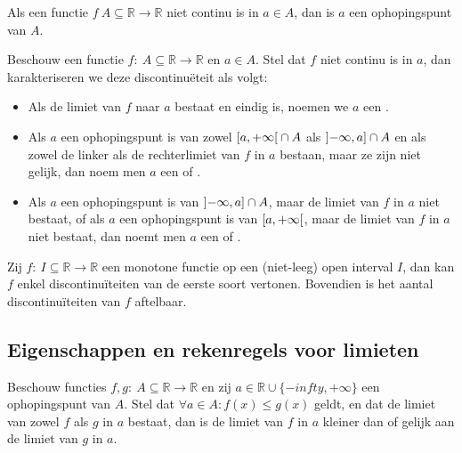 \documentclass[main.tex]{subfiles}
\begin{document}
\begin{pr}
  Als een functie $f\ A \subseteq \mathbb{R} \rightarrow \mathbb{R}$ niet continu is in $a\in A$, dan is $a$ een ophopingspunt van $A$.
\end{pr}

\begin{de}
  Beschouw een functie $f:\ A \subseteq \mathbb{R} \rightarrow \mathbb{R}$ en $a\in A$.
  Stel dat $f$ niet continu is in $a$, dan karakteriseren we deze discontinu\"eteit als volgt:
  \begin{itemize}
  \item Als de limiet van $f$ naar $a$ bestaat en eindig is, noemen we $a$ een .
  \item Als $a$ een ophopingspunt is van zowel $\interval[open right]{a}{+\infty} \cap A$ als $\interval[open left]{-\infty}{a} \cap A$ en als zowel de linker als de rechterlimiet van $f$ in $a$ bestaan, maar ze zijn niet gelijk, dan noem men $a$ een  of .
  \item Als $a$ een ophopingspunt is van $\interval[open left]{-\infty}{a} \cap A$, maar de limiet van $f$ in $a$ niet bestaat, of als $a$ een ophopingspunt is van $\interval[open right]{a}{+\infty}$, maar de limiet van $f$ in $a$ niet bestaat, dan noemt men $a$ een  of .
  \end{itemize}
\end{de}

\begin{pr}
  Zij $f:\ I \subseteq \mathbb{R} \rightarrow \mathbb{R}$ een monotone functie op een (niet-leeg) open interval $I$, dan kan $f$ enkel discontinu\"iteiten van de eerste soort vertonen.
  Bovendien is het aantal discontinu\"iteiten van $f$ aftelbaar.
\end{pr}


\subsection{Eigenschappen en rekenregels voor limieten}
\label{sec:eigensch-en-rekenr}

\begin{pr}
  Beschouw functies $f,g:\ A \subseteq \mathbb{R} \rightarrow \mathbb{R}$ en zij $a\in \mathbb{R} \cup \{-infty,+\infty\}$ een ophopingspunt van $A$.
  Stel dat $\forall a\in A: f(x) \le g(x)$ geldt, en dat de limiet van zowel $f$ als $g$ in $a$ bestaat, dan is de limiet van $f$ in $a$ kleiner dan of gelijk aan de limiet van $g$ in $a$.\
\end{pr}
\end{document}

